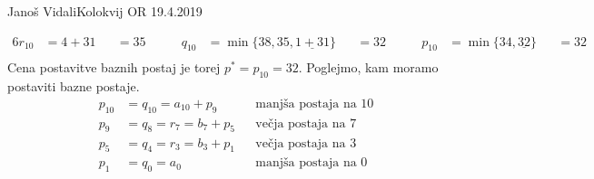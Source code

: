 \begin{naloga}{Janoš Vidali}{Kolokvij OR 19.4.2019}
\begin{odgovor}
\begin{enumerate}[(a)]
\begin{alignat*}{6}
r_{10} &= 4+31                                  &&= 35 &\qquad
q_{10} &= \min\{38, 35, \underline{1+31}\}      &&= 32 &\qquad
p_{10} &= \min\{34, \underline{32}\}            &&= 32 \\
\end{alignat*}
Cena postavitve baznih postaj je torej $p^* = p_{10} = 32$.
Poglejmo, kam moramo postaviti bazne postaje.
\begin{align*}
p_{10} &= q_{10}       = a_{10} + p_9 && \text{manjša postaja na $10$} \\
p_9    &= q_8    = r_7 = b_7    + p_5 && \text{večja postaja na $7$}   \\
p_5    &= q_4    = r_3 = b_3    + p_1 && \text{večja postaja na $3$}   \\
p_1    &= q_0          = a_0          && \text{manjša postaja na $0$}
\end{align*}
\end{enumerate}
\end{odgovor}
\end{naloga}
